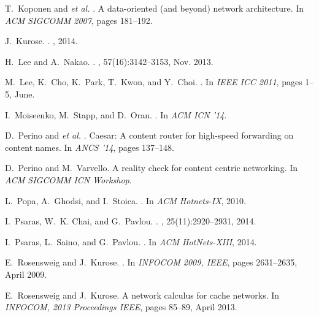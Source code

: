 \documentclass{sig-alternate}
\newcommand{\etal}{{\em et al. \/}}
\begin{document}
\begin{thebibliography}{10}
T.~Koponen and \etal.
\newblock A data-oriented (and beyond) network architecture.
\newblock In {\em ACM SIGCOMM 2007}, pages 181--192.

J.~Kurose.
.
, 2014.

H.~Lee and A.~Nakao.
.
, 57(16):3142--3153, Nov. 2013.

M.~Lee, K.~Cho, K.~Park, T.~Kwon, and Y.~Choi.
.
\newblock In {\em IEEE ICC 2011}, pages 1--5, June.

I.~Moiseenko, M.~Stapp, and D.~Oran.
.
\newblock In {\em ACM ICN '14}.

D.~Perino and \etal.
\newblock Caesar: A content router for high-speed forwarding on content names.
\newblock In {\em ANCS '14}, pages 137--148.

D.~Perino and M.~Varvello.
\newblock A reality check for content centric networking.
\newblock In {\em ACM SIGCOMM ICN Workshop}.

L.~Popa, A.~Ghodsi, and I.~Stoica.
.
\newblock In {\em ACM Hotnets-IX}, 2010.

I.~Psaras, W.~K. Chai, and G.~Pavlou.
.
, 25(11):2920--2931, 2014.

I.~Psaras, L.~Saino, and G.~Pavlou.
.
\newblock In {\em ACM HotNets-XIII}, 2014.

E.~Rosensweig and J.~Kurose.
.
\newblock In {\em INFOCOM 2009, IEEE}, pages 2631--2635, April 2009.

E.~Rosensweig and J.~Kurose.
\newblock A network calculus for cache networks.
\newblock In {\em INFOCOM, 2013 Proceedings IEEE}, pages 85--89, April 2013.


\end{thebibliography}
\end{document}
